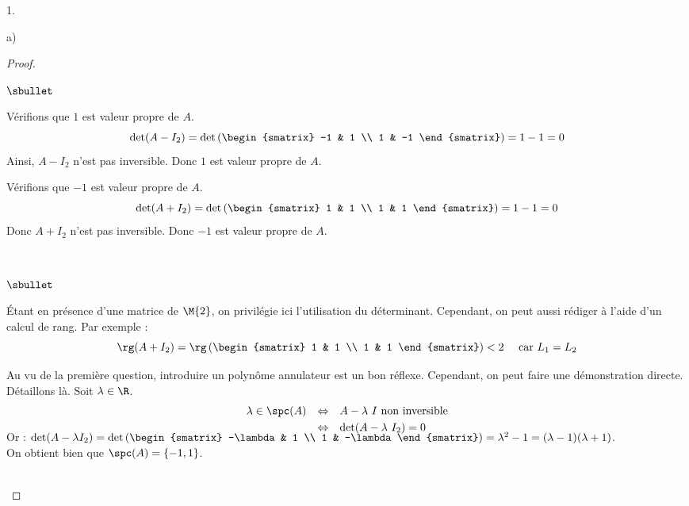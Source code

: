 \begin{noliste}{1.}
\begin{noliste}{a)}
\begin{proof}
\begin{noliste}{$\sbullet$}
      \item Vérifions que $1$ est valeur propre de $A$.
	\[
	\det (A-I_2) = \det
        \left(
        \begin{smatrix}
          -1 & 1 \\
          1 & -1
	\end{smatrix}
        \right) = 1 - 1 = 0
	\]
	Ainsi, $A-I_2$ n'est pas inversible. Donc $1$ est valeur
        propre de $A$.
      \item Vérifions que $-1$ est valeur propre de $A$.
	\[
	\det (A+I_2) = \det \left(
          \begin{smatrix} 
            1 & 1 \\
            1 & 1
          \end{smatrix} \right) = 1 - 1 = 0
	\]
        Donc $A+I_2$ n'est pas inversible. Donc $-1$ est valeur propre
        de $A$.
      \end{noliste}
      ~\\[-1.4cm]      
      \begin{remark}%
        \begin{noliste}{$\sbullet$}
        \item Étant en présence d'une matrice de $\M{2}$, on privilégie
          ici l'utilisation du déterminant. Cependant, on peut aussi
          rédiger à l'aide d'un calcul de rang. Par exemple :
          \[
          \rg (A+I_2) = \rg \left(
            \begin{smatrix} 
              1 & 1 \\
              1 & 1
            \end{smatrix} \right) < 2 \quad \text{ car $L_1 = L_2$}
          \]
        \item Au vu de la première question, introduire un polynôme
          annulateur est un bon réflexe. Cependant, on peut faire une
          démonstration directe.\\
        Détaillons là. Soit $\lambda \in \R$.
          \[
          \begin{array}{rcl}
            \lambda \in \spc(A) & \Leftrightarrow & \text{$A-\lambda \ I$
              non inversible}
            \\[.1cm]
            & \Leftrightarrow & \det(A - \lambda \ I_2) = 0
            \\[-.4cm]
          \end{array}
          \]
          Or : $\det(A-\lambda I_2) = \det \left(
            \begin{smatrix}
              -\lambda & 1 \\
              1 & -\lambda
            \end{smatrix}
          \right) = \lambda^2-1 = (\lambda-1)(\lambda+1)$.\\          
          On obtient bien que $\spc(A) = \{-1,1\}$.
        \end{noliste}
      \end{remark}~\\[-1.4cm]
    \end{proof}
	


\end{noliste}
\end{noliste}
